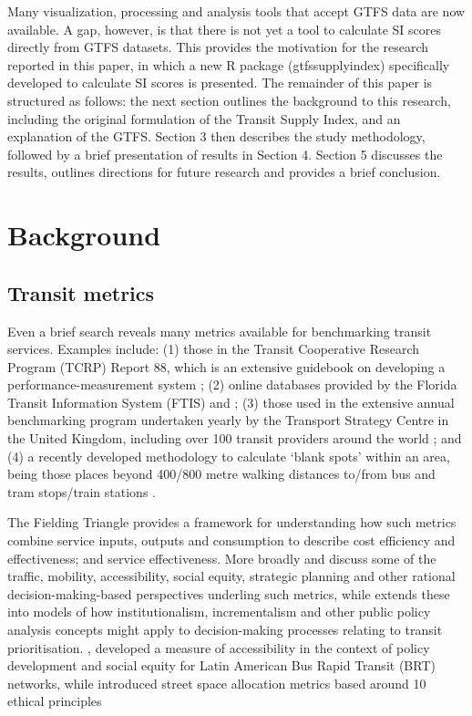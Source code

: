 \documentclass[preprint, 3p,
authoryear]{elsarticle} %
\begin{document}
Many visualization, processing and analysis tools that accept GTFS data
are now available. A gap, however, is that there is not yet a tool to
calculate SI scores directly from GTFS datasets. This provides the
motivation for the research reported in this paper, in which a new R
package (gtfssupplyindex) specifically developed to calculate SI scores
is presented. The remainder of this paper is structured as follows: the
next section outlines the background to this research, including the
original formulation of the Transit Supply Index, and an explanation of
the GTFS. Section 3 then describes the study methodology, followed by a
brief presentation of results in Section 4. Section 5 discusses the
results, outlines directions for future research and provides a brief
conclusion.

\hypertarget{background}{%
\section{Background}\label{background}}

\hypertarget{transit-metrics}{%
\subsection{Transit metrics}\label{transit-metrics}}

Even a brief search reveals many metrics available for benchmarking
transit services. Examples include: (1) those in the Transit Cooperative
Research Program (TCRP) Report 88, which is an extensive guidebook on
developing a performance-measurement system \citep{Ryus:2003aa}; (2)
online databases provided by the Florida Transit Information System
(FTIS) \citep{Florida-Transit-Information-System:2018aa} and
\citet{UITP:2015aa}; (3) those used in the extensive annual benchmarking
program undertaken yearly by the Transport Strategy Centre in the United
Kingdom, including over 100 transit providers around the world
\citep{Imperial-College-London:2023aa}; and (4) a recently developed
methodology to calculate `blank spots' within an area, being those
places beyond 400/800 metre walking distances to/from bus and tram
stops/train stations \citep{AlamriSultan2023GAoA}.

The Fielding Triangle \citep{FieldingGordonJ1987Mpts} provides a
framework for understanding how such metrics combine service inputs,
outputs and consumption to describe cost efficiency and effectiveness;
and service effectiveness. More broadly \citet{Litman:2003ab} and
\citet{Litman:2016aa} discuss some of the traffic, mobility,
accessibility, social equity, strategic planning and other rational
decision-making-based perspectives underling such metrics, while
\citet{Reynolds:2017ah} extends these into models of how
institutionalism, incrementalism and other public policy analysis
concepts might apply to decision-making processes relating to transit
prioritisation. \citet{GuzmanLuisA.2017Aeit}, developed a measure of
accessibility in the context of policy development and social equity for
Latin American Bus Rapid Transit (BRT) networks, while
\citet{Creutzig2020streetspaceallocation} introduced street space
allocation metrics based around 10 ethical principles
\end{document}
